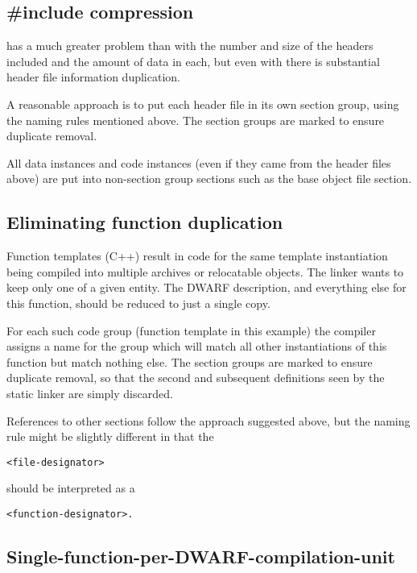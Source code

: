\subsection{\#include compression}
\label{app:includecompression}

 has a much greater 
problem than 
 with the number and
size of the headers included and the amount of data in each,
but even with  
there is substantial header file information
duplication.

A reasonable approach is to put each header file in its own
section group, using the naming rules mentioned above. The
section groups are marked to ensure duplicate removal.

All data instances and code instances (even if they came
from the header files above) are put into non-section group
sections such as the base object file 
 section.

\subsection{Eliminating function duplication}
\label{app:eliminatingfunctionduplication}


Function templates (C++) result in code for the same template
instantiation being compiled into multiple archives or
relocatable objects. The linker wants to keep only one of a
given entity. The DWARF description, and everything else for
this function, should be reduced to just a single copy.

For each such code group (function template in this example)
the compiler assigns a name for the group which will match
all other instantiations of this function but match nothing
else. The section groups are marked to ensure duplicate
removal, so that the second and subsequent definitions seen
by the static linker are simply discarded.


References to other 
 sections follow the approach
suggested above, but the naming rule might be slightly
different in that the 
\begin{alltt}
<file-designator> 
\end{alltt}
should be interpreted
as a 
\begin{alltt}
<function-designator>.
\end{alltt}



\subsection{Single-function-per-DWARF-compilation-unit}
\label{app:singlefunctionperdwarfcompilationunit}

